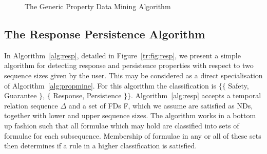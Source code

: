{\line
\begin{figure}[ht]
\begin{center}
\caption{\label{tr:fig:propmine} The Generic Property Data Mining Algorithm}
\end{center}
\end{figure}
}



\subsection{The Response Persistence Algorithm}\label{subsec:tr_resppers}
In Algorithm~\ref{alg:resp}, detailed in Figure~\ref{tr:fig:resp}, we
present a simple algorithm for detecting response and persistence
properties with respect to two sequence sizes given by the user. This
may be considered as a direct specialisation of
Algorithm~\ref{alg:propmine}. For this algorithm the classification is
$\{ \{$ Safety, Guarantee $\}$, $\{$ Response, Persistence $\} \}$.
Algorithm~\ref{alg:resp} accepts a temporal relation sequence $\Delta$
and a set of FDs F, which we assume are satisfied as NDs, together
with lower and upper sequence sizes. The algorithm works in a bottom up
fashion such that all formulae which may hold are classified into
sets of formulae for each subsequence. Membership of formulae in any
or all of these sets then determines if a rule in a higher
classification is satisfied.

